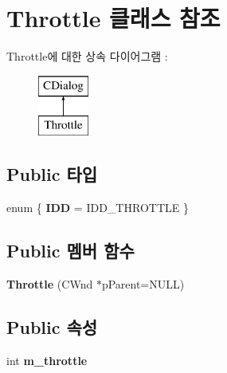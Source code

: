 \hypertarget{class_throttle}{}\section{Throttle 클래스 참조}
\label{class_throttle}
Throttle에 대한 상속 다이어그램 \+: \begin{figure}[H]
\begin{center}
\leavevmode
\includegraphics[height=2.000000cm]{class_throttle}
\end{center}
\end{figure}
\subsection*{Public 타입}
\begin{DoxyCompactItemize}
\item 
\mbox{\label{class_throttle_abdcbc5b42292d645e94509c3735773a0}} 
enum \{ {\bfseries I\+DD} = I\+D\+D\+\_\+\+T\+H\+R\+O\+T\+T\+LE
 \}
\end{DoxyCompactItemize}
\subsection*{Public 멤버 함수}
\begin{DoxyCompactItemize}
\item 
\mbox{\label{class_throttle_ad87807ba6799b18bfb06e6e7bd3c4b62}} 
{\bfseries Throttle} (C\+Wnd $\ast$p\+Parent=N\+U\+LL)
\end{DoxyCompactItemize}
\subsection*{Public 속성}
\begin{DoxyCompactItemize}
\item 
\mbox{\label{class_throttle_aba71c48b95cd2a114625ebb3db55bc0b}} 
int {\bfseries m\+\_\+throttle}
\end{DoxyCompactItemize}
